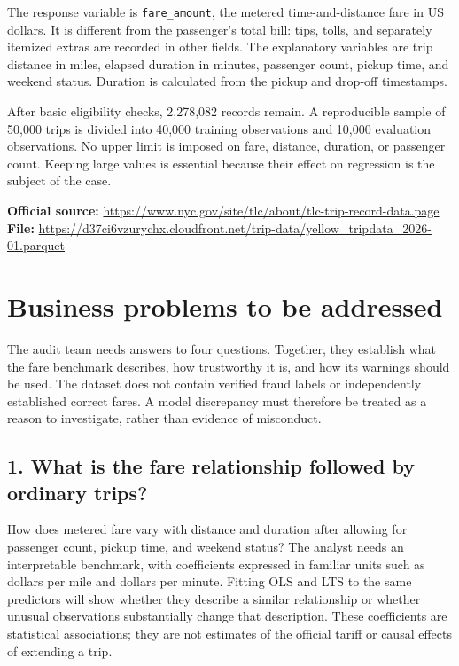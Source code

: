 \documentclass[11pt,letterpaper]{article}
\begin{document}
The response variable is \texttt{fare\_amount}, the metered time-and-distance fare in US dollars. It is different from the passenger's total bill: tips, tolls, and separately itemized extras are recorded in other fields. The explanatory variables are trip distance in miles, elapsed duration in minutes, passenger count, pickup time, and weekend status. Duration is calculated from the pickup and drop-off timestamps.

After basic eligibility checks, 2,278,082 records remain. A reproducible sample of 50,000 trips is divided into 40,000 training observations and 10,000 evaluation observations. No upper limit is imposed on fare, distance, duration, or passenger count. Keeping large values is essential because their effect on regression is the subject of the case.

\small
\textbf{Official source:} \url{https://www.nyc.gov/site/tlc/about/tlc-trip-record-data.page}\\
\textbf{File:} \url{https://d37ci6vzurychx.cloudfront.net/trip-data/yellow_tripdata_2026-01.parquet}
\normalsize

\newpage
\section*{Business problems to be addressed}
The audit team needs answers to four questions. Together, they establish what the fare benchmark describes, how trustworthy it is, and how its warnings should be used. The dataset does not contain verified fraud labels or independently established correct fares. A model discrepancy must therefore be treated as a reason to investigate, rather than evidence of misconduct.

\subsection*{1. What is the fare relationship followed by ordinary trips?}
How does metered fare vary with distance and duration after allowing for passenger count, pickup time, and weekend status? The analyst needs an interpretable benchmark, with coefficients expressed in familiar units such as dollars per mile and dollars per minute. Fitting OLS and LTS to the same predictors will show whether they describe a similar relationship or whether unusual observations substantially change that description. These coefficients are statistical associations; they are not estimates of the official tariff or causal effects of extending a trip.
\end{document}
